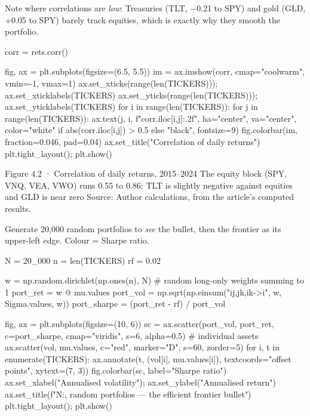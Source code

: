 \documentclass{pyportfolios-note}
\begin{document}

Note where correlations are \textit{low}: Treasuries (TLT, −0.21 to SPY) and
gold (GLD, +0.05 to SPY) barely track equities, which is exactly why they smooth
the portfolio.

\begin{notecode}
corr = rets.corr()

fig, ax = plt.subplots(figsize=(6.5, 5.5))
im = ax.imshow(corr, cmap="coolwarm", vmin=-1, vmax=1)
ax.set_xticks(range(len(TICKERS))); ax.set_xticklabels(TICKERS)
ax.set_yticks(range(len(TICKERS))); ax.set_yticklabels(TICKERS)
for i in range(len(TICKERS)):
    for j in range(len(TICKERS)):
        ax.text(j, i, f"{corr.iloc[i,j]:.2f}", ha="center", va="center",
                color="white" if abs(corr.iloc[i,j]) > 0.5 else "black", fontsize=9)
fig.colorbar(im, fraction=0.046, pad=0.04)
ax.set_title("Correlation of daily returns")
plt.tight_layout(); plt.show()
\end{notecode}

  {Figure 4.2 · Correlation of daily returns, 2015–2024}
  {The equity block (SPY, VNQ, VEA, VWO) runs 0.55 to 0.86; TLT is slightly
   negative against equities and GLD is near zero}
  {Source: Author calculations, from the article's computed results.}


Generate 20,000 random portfolios to \textit{see} the bullet, then the frontier
as its upper-left edge. Colour = Sharpe ratio.

\begin{notecode}
N = 20_000
n = len(TICKERS)
rf = 0.02

w = np.random.dirichlet(np.ones(n), N)          # random long-only weights summing to 1
port_ret = w @ mu.values
port_vol = np.sqrt(np.einsum("ij,jk,ik->i", w, Sigma.values, w))
port_sharpe = (port_ret - rf) / port_vol

fig, ax = plt.subplots(figsize=(10, 6))
sc = ax.scatter(port_vol, port_ret, c=port_sharpe, cmap="viridis", s=6, alpha=0.5)
# individual assets
ax.scatter(vol, mu.values, c="red", marker="D", s=60, zorder=5)
for i, t in enumerate(TICKERS):
    ax.annotate(t, (vol[i], mu.values[i]), textcoords="offset points", xytext=(7, 3))
fig.colorbar(sc, label="Sharpe ratio")
ax.set_xlabel("Annualised volatility"); ax.set_ylabel("Annualised return")
ax.set_title(f"{N:,} random portfolios — the efficient frontier bullet")
plt.tight_layout(); plt.show()
\end{notecode}
\end{document}
